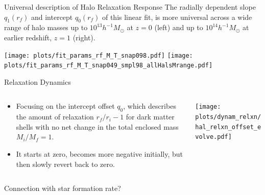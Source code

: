 \documentclass{beamer}
\newcommand{\Mh}{\ensuremath{h^{-1}M_{\odot}}}
\begin{document}
\begin{frame}{Universal description of Halo Relaxation Response}
    The radially dependent slope $q_1(r_f)$ and intercept $q_0(r_f)$ of this linear fit, is more universal across a wide range of halo masses up to $10^{13} \Mh$ at $z=0$ (left) and up to $10^{14} \Mh$ at earlier redshift, $z=1$ (right).
    \begin{center}
        \texttt{[image: plots/fit\_params\_rf\_M\_T\_snap098.pdf]}
        \texttt{[image: plots/fit\_params\_rf\_M\_T\_snap049\_smpl98\_allHalsMrange.pdf]}
        \hspace{-3.8cm}\hspace{20cm}
    \end{center}
\end{frame}



\begin{frame}{Relaxation Dynamics}
        
    \begin{columns}
        \begin{column}{0.5\linewidth} 
            \begin{itemize}
                \item Focusing on the intercept offset $q_0$, which describes the amount of relaxation $r_f/r_i-1$ for dark matter shells with no net change in the total enclosed mass $M_i/M_f=1$.
                \item It starts at zero, becomes more negative initially, but then slowly revert back to zero.
            \end{itemize}
        \end{column}
        \begin{column}{0.49\linewidth}
            \begin{center}
                \texttt{[image: plots/dynam\_relxn/hal\_relxn\_offset\_evolve.pdf]}
            \end{center}
        \end{column}
    \end{columns}
    \begin{block}{}
        Connection with star formation rate?
        ~\vspace{1cm}
    \end{block}
\end{frame}
\end{document}
